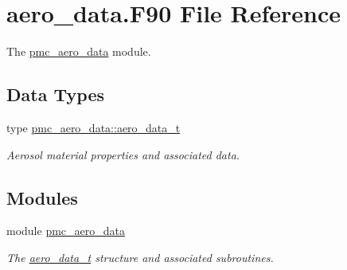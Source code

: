 \hypertarget{aero__data_8_f90}{}\section{aero\+\_\+data.\+F90 File Reference}
\label{aero__data_8_f90}


The \mbox{\hyperlink{namespacepmc__aero__data}{pmc\+\_\+aero\+\_\+data}} module.  


\subsection*{Data Types}
\begin{DoxyCompactItemize}
\item 
type \mbox{\hyperlink{structpmc__aero__data_1_1aero__data__t}{pmc\+\_\+aero\+\_\+data\+::aero\+\_\+data\+\_\+t}}
\begin{DoxyCompactList}\small\item\em Aerosol material properties and associated data. \end{DoxyCompactList}\end{DoxyCompactItemize}
\subsection*{Modules}
\begin{DoxyCompactItemize}
\item 
module \mbox{\hyperlink{namespacepmc__aero__data}{pmc\+\_\+aero\+\_\+data}}
\begin{DoxyCompactList}\small\item\em The \mbox{\hyperlink{structpmc__aero__data_1_1aero__data__t}{aero\+\_\+data\+\_\+t}} structure and associated subroutines. \end{DoxyCompactList}\end{DoxyCompactItemize}
